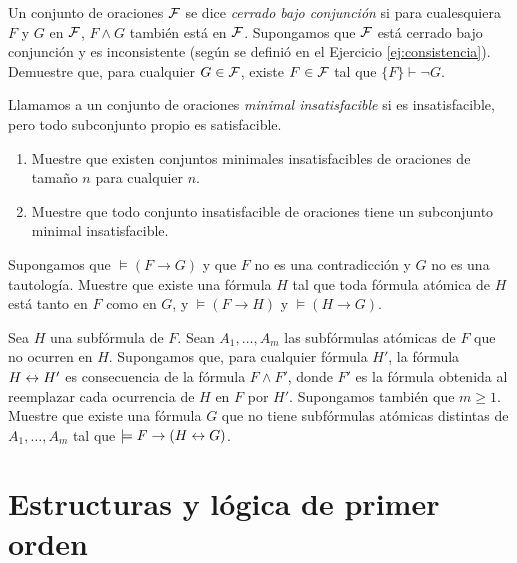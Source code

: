 \documentclass[12pt,a4paper]{book}
\begin{document}
    \begin{ejercicio}
        Un conjunto de oraciones $\mathcal{F}$ se dice \textit{cerrado bajo conjunción} si para cualesquiera $F$ y $G$ en $\mathcal{F}$,
        $F\wedge G$ también está en $\mathcal{F}$. Supongamos que $\mathcal{F}$ está cerrado bajo conjunción y es inconsistente (según se
        definió en el Ejercicio \ref{ej:consistencia}). Demuestre que, para cualquier $G\in\mathcal{F}$, existe $F\in\mathcal{F}$ tal que
        $\{F\}\vdash\neg G$.
    \end{ejercicio}

    \begin{ejercicio}
        Llamamos a un conjunto de oraciones \textit{minimal insatisfacible} si es insatisfacible, pero todo subconjunto
        propio es satisfacible.
        \begin{enumerate}[label=(\alph*)]
            \item Muestre que existen conjuntos minimales insatisfacibles de oraciones de tamaño $n$ para cualquier $n$.
            \item Muestre que todo conjunto insatisfacible de oraciones tiene un subconjunto minimal insatisfacible.
        \end{enumerate}
    \end{ejercicio}

    \begin{ejercicio}
        Supongamos que $\models(F\rightarrow G)$ y que $F$ no es una contradicción y $G$ no es una tautología. Muestre que
        existe una fórmula $H$ tal que toda fórmula atómica de $H$ está tanto en $F$ como en $G$, y $\models(F\rightarrow H)$
        y $\models(H\rightarrow G)$.
    \end{ejercicio}

    \begin{ejercicio}
        Sea $H$ una subfórmula de $F$. Sean $A_{1},\dots,A_{m}$ las subfórmulas atómicas de $F$ que no ocurren en $H$.
        Supongamos que, para cualquier fórmula $H'$, la fórmula $H\leftrightarrow H'$ es consecuencia de la fórmula $F\wedge F'$, donde
        $F'$ es la fórmula obtenida al reemplazar cada ocurrencia de $H$ en $F$ por $H'$. Supongamos también que $m\geq 1$.
        Muestre que existe una fórmula $G$ que no tiene subfórmulas atómicas distintas de $A_{1},\dots,A_{m}$ tal que
        $\models F\rightarrow(H\leftrightarrow G)$.
    \end{ejercicio}

    \chapter{Estructuras y lógica de primer orden}
\end{document}
